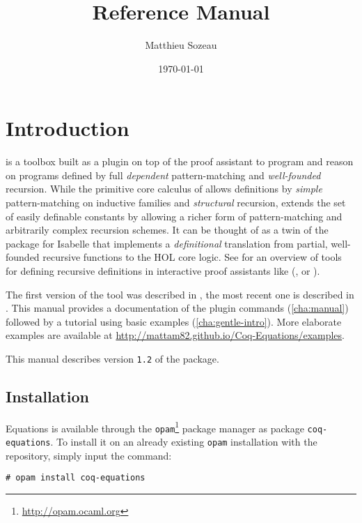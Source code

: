 \documentclass{report}
\author{Matthieu Sozeau}
\date{\today}
\title{\Equations \eqnversion Reference Manual}
\def\eqnversion{\texttt{1.2}\xspace}
\begin{document}
\maketitle

\def\coqlibrary#1#2#3{}

\def\Equations{\texorpdfstring{\name{Equations}}{Equations}}

\chapter*{Introduction}
\label{cha:introduction}

\Equations is a toolbox built as a plugin on top of the \Coq proof assistant
to program and reason on programs defined by full \emph{dependent}
pattern-matching and \emph{well-founded} recursion. While the primitive
core calculus of \Coq allows definitions by \emph{simple} pattern-matching on
inductive families and \emph{structural} recursion, \Equations extends
the set of easily definable constants by allowing a richer form of
pattern-matching and arbitrarily complex recursion schemes. It can be
thought of as a twin of the  package for Isabelle that
implements a \emph{definitional} translation from partial, well-founded
recursive functions to the HOL core logic. See
\cite{BoveKraussSozeau2011} for an overview of tools for defining
recursive definitions in interactive proof assistants like (\Coq, \Agda
or \Isabelle).

The first version of the tool was described in
\cite{sozeau.Coq/Equations/ITP10}, the most recent one is described in
\cite{mansoz17}. This manual provides a documentation of the plugin
commands (\autoref{cha:manual}) followed by a tutorial using basic
examples (\autoref{cha:gentle-intro}).  More elaborate examples are
available at \url{http://mattam82.github.io/Coq-Equations/examples}.

This manual describes version \eqnversion of the package.

\section*{Installation}

Equations is available through the
\texttt{opam}\footnote{\url{http://opam.ocaml.org}} package manager as
package \texttt{coq-equations}. To install it on an already existing
\texttt{opam} installation with the \Coq repository, simply input the
command:
\begin{verbatim}
# opam install coq-equations
\end{verbatim}
\end{document}
